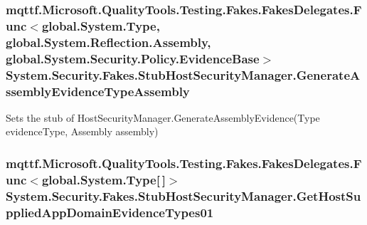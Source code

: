 \hypertarget{class_system_1_1_security_1_1_fakes_1_1_stub_host_security_manager_ab61b5e39c9dbfff17a68a597c1768358}{
\subsubsection[{Generate\-Assembly\-Evidence\-Type\-Assembly}]{\setlength{\rightskip}{0pt plus 5cm}mqttf.\-Microsoft.\-Quality\-Tools.\-Testing.\-Fakes.\-Fakes\-Delegates.\-Func$<$global.\-System.\-Type, global.\-System.\-Reflection.\-Assembly, global.\-System.\-Security.\-Policy.\-Evidence\-Base$>$ System.\-Security.\-Fakes.\-Stub\-Host\-Security\-Manager.\-Generate\-Assembly\-Evidence\-Type\-Assembly}}\label{class_system_1_1_security_1_1_fakes_1_1_stub_host_security_manager_ab61b5e39c9dbfff17a68a597c1768358}


Sets the stub of Host\-Security\-Manager.\-Generate\-Assembly\-Evidence(\-Type evidence\-Type, Assembly assembly)

\hypertarget{class_system_1_1_security_1_1_fakes_1_1_stub_host_security_manager_af629183711a0636a6cd6bbbb407f1fef}{
\subsubsection[{Get\-Host\-Supplied\-App\-Domain\-Evidence\-Types01}]{\setlength{\rightskip}{0pt plus 5cm}mqttf.\-Microsoft.\-Quality\-Tools.\-Testing.\-Fakes.\-Fakes\-Delegates.\-Func$<$global.\-System.\-Type\mbox{[}$\,$\mbox{]}$>$ System.\-Security.\-Fakes.\-Stub\-Host\-Security\-Manager.\-Get\-Host\-Supplied\-App\-Domain\-Evidence\-Types01}}\label{class_system_1_1_security_1_1_fakes_1_1_stub_host_security_manager_af629183711a0636a6cd6bbbb407f1fef}


